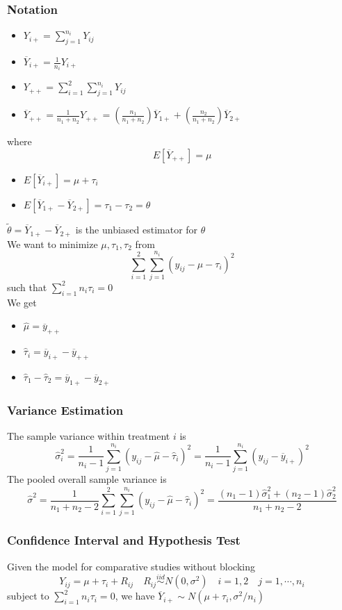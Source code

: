 \documentclass[11pt]{article}
\newcommand{\ds}{\displaystyle}
\begin{document}
\subsubsection{Notation}
\begin{itemize}
    \item $\ds Y_{i+} = \sum_{j=1}^{n_i}Y_{ij}$
    \item $\ds\overline{Y}_{i+} = \frac{1}{n_i}Y_{i+}$
    \item $\ds Y_{++} = \sum_{i=1}^{2}\sum_{j=1}^{n_i}Y_{ij}$
    \item $\ds\overline{Y}_{++} = \frac{1}{n_1+n_2}Y_{++} = (\frac{n_1}{n_1+n_2})\overline{Y}_{1+} + (\frac{n_2}{n_1+n_2})\overline{Y}_{2+}$
\end{itemize}
where \[E\left[\overline{Y}_{++}\right] = \mu\]
\begin{itemize}
    \item $E[\overline{Y}_{i+}] = \mu+\tau_i$
    \item $E[\overline{Y}_{1+} - \overline{Y}_{2+}] = \tau_1-\tau_2 = \theta$
\end{itemize}
$\tilde{\theta} = \overline{Y}_{1+} - \overline{Y}_{2+}$ is the unbiased estimator for $\theta$ \\
We want to minimize $\mu,\tau_1,\tau_2$ from 
\[\sum_{i=1}^{2}\sum_{j=1}^{n_i}(y_{ij}-\mu-\tau_i)^2\]
such that $\sum_{i=1}^{2}n_i\tau_i=0$ \\
We get 
\begin{itemize}
    \item $\hat\mu = \overline{y}_{++}$
    \item $\hat\tau_i = \overline{y}_{i+}-\overline{y}_{++}$
    \item $\hat\tau_1 - \hat\tau_2 = \overline{y}_{1+}-\overline{y}_{2+}$
\end{itemize}
\subsubsection*{Variance Estimation}
The sample variance within treatment $i$ is 
\[\hat\sigma_i^2 = \frac{1}{n_i - 1}\sum_{j=1}^{n_i}(y_{ij}-\hat\mu-\hat\tau_i)^2 = \frac{1}{n_i-1}\sum_{j=1}^{n_i}(y_{ij}-\overline{y}_{i+})^2\]
The pooled overall sample variance is 
\[\hat\sigma^2 = \frac{1}{n_1+n_2-2}\sum_{i=1}^{2}\sum_{j=1}^{n_i}(y_{ij}-\hat\mu-\hat\tau_i)^2 = \frac{(n_1-1)\hat\sigma_1^2 + (n_2-1)\hat\sigma_2^2}{n_1+n_2-2}\] 
\subsubsection{Confidence Interval and Hypothesis Test}
Given the model for comparative studies without blocking 
\[Y_{ij}=\mu+\tau_i+R_{ij}\quad R_{ij}\overset{iid}{\sim}N(0,\sigma^2)\quad i=1,2\quad j=1,\cdots,n_i\]
subject to $\sum_{i=1}^{2}n_i\tau_i=0$, we have $\overline{Y}_{i+}\sim N(\mu+\tau_i,\sigma^2/n_i)$
\end{document}

